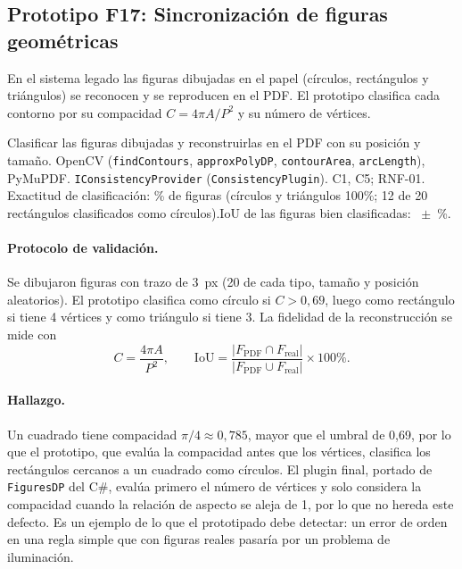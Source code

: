 \subsection{Prototipo F17: Sincronización de figuras geométricas}

En el sistema legado \citep{pezoa2020} las figuras dibujadas en el papel (círculos, rectángulos y triángulos) se reconocen y se reproducen en el PDF. El prototipo clasifica cada contorno por su compacidad $C=4\pi A/P^2$ y su número de vértices.

{Clasificar las figuras dibujadas y reconstruirlas en el PDF con su posición y tamaño.}
{OpenCV (\texttt{findContours}, \texttt{approxPolyDP}, \texttt{contourArea}, \texttt{arcLength}), PyMuPDF.}
{\texttt{IConsistencyProvider} (\texttt{ConsistencyPlugin}).}
{C1, C5; RNF-01.}
{ Exactitud de clasificación: \FDiecisieteExactitudPct\% de \FDiecisieteFiguras{} figuras (círculos y triángulos 100\%; 12 de 20 rectángulos clasificados como círculos).\newline IoU de las figuras bien clasificadas: \FDiecisieteIouPct~$\pm$~\FDiecisieteIouSd\%.}

\paragraph{Protocolo de validación.} Se dibujaron \FDiecisieteFiguras{} figuras con trazo de 3~px (20 de cada tipo, tamaño y posición aleatorios). El prototipo clasifica como círculo si $C>0{,}69$, luego como rectángulo si tiene 4 vértices y como triángulo si tiene 3. La fidelidad de la reconstrucción se mide con
\begin{equation}
C=\frac{4\pi A}{P^2},\qquad \mathrm{IoU}=\frac{|F_{\text{PDF}}\cap F_{\text{real}}|}{|F_{\text{PDF}}\cup F_{\text{real}}|}\times100\%.
\end{equation}

\paragraph{Hallazgo.} Un cuadrado tiene compacidad $\pi/4\approx0{,}785$, mayor que el umbral de 0,69, por lo que el prototipo, que evalúa la compacidad antes que los vértices, clasifica los rectángulos cercanos a un cuadrado como círculos. El plugin final, portado de \texttt{FiguresDP} del C\#, evalúa primero el número de vértices y solo considera la compacidad cuando la relación de aspecto se aleja de 1, por lo que no hereda este defecto. Es un ejemplo de lo que el prototipado debe detectar: un error de orden en una regla simple que con figuras reales pasaría por un problema de iluminación.

